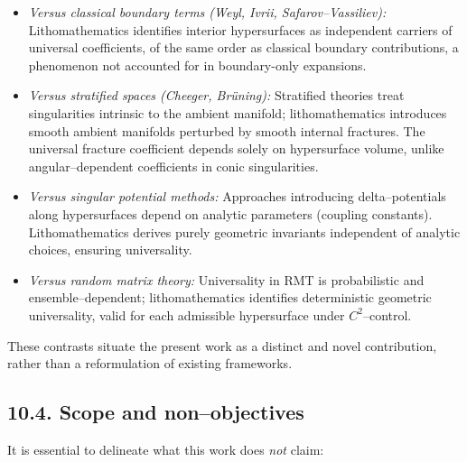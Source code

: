 \begin{itemize}
\item \emph{Versus classical boundary terms (Weyl, Ivrii, Safarov–Vassiliev):}  
Lithomathematics identifies interior hypersurfaces as independent carriers of universal coefficients, of the same order as classical boundary contributions, a phenomenon not accounted for in boundary-only expansions.

\item \emph{Versus stratified spaces (Cheeger, Brüning):}  
Stratified theories treat singularities intrinsic to the ambient manifold; lithomathematics introduces smooth ambient manifolds perturbed by smooth internal fractures. The universal fracture coefficient depends solely on hypersurface volume, unlike angular–dependent coefficients in conic singularities.

\item \emph{Versus singular potential methods:}  
Approaches introducing delta–potentials along hypersurfaces depend on analytic parameters (coupling constants). Lithomathematics derives purely geometric invariants independent of analytic choices, ensuring universality.

\item \emph{Versus random matrix theory:}  
Universality in RMT is probabilistic and ensemble–dependent; lithomathematics identifies deterministic geometric universality, valid for each admissible hypersurface under $C^2$–control.
\end{itemize}

These contrasts situate the present work as a distinct and novel contribution, rather than a reformulation of existing frameworks.

\subsection*{10.4. Scope and non–objectives}
It is essential to delineate what this work does \emph{not} claim:

